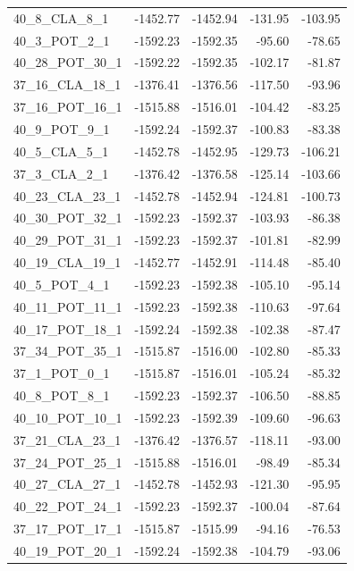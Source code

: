 \documentclass[journal=jacsat,manuscript=article]{achemso}
\begin{document}
\begin{table}[b!]
\begin{tabular}{lrrrr}
40\_8\_CLA\_8\_1   &  -1452.77 &  -1452.94 & -131.95 & -103.95 \\
40\_3\_POT\_2\_1   &  -1592.23 &  -1592.35 &  -95.60 &  -78.65 \\
40\_28\_POT\_30\_1 &  -1592.22 &  -1592.35 & -102.17 &  -81.87 \\
37\_16\_CLA\_18\_1 &  -1376.41 &  -1376.56 & -117.50 &  -93.96 \\
37\_16\_POT\_16\_1 &  -1515.88 &  -1516.01 & -104.42 &  -83.25 \\
40\_9\_POT\_9\_1   &  -1592.24 &  -1592.37 & -100.83 &  -83.38 \\
40\_5\_CLA\_5\_1   &  -1452.78 &  -1452.95 & -129.73 & -106.21 \\
37\_3\_CLA\_2\_1   &  -1376.42 &  -1376.58 & -125.14 & -103.66 \\
40\_23\_CLA\_23\_1 &  -1452.78 &  -1452.94 & -124.81 & -100.73 \\
40\_30\_POT\_32\_1 &  -1592.23 &  -1592.37 & -103.93 &  -86.38 \\
40\_29\_POT\_31\_1 &  -1592.23 &  -1592.37 & -101.81 &  -82.99 \\
40\_19\_CLA\_19\_1 &  -1452.77 &  -1452.91 & -114.48 &  -85.40 \\
40\_5\_POT\_4\_1   &  -1592.23 &  -1592.38 & -105.10 &  -95.14 \\
40\_11\_POT\_11\_1 &  -1592.23 &  -1592.38 & -110.63 &  -97.64 \\
40\_17\_POT\_18\_1 &  -1592.24 &  -1592.38 & -102.38 &  -87.47 \\
37\_34\_POT\_35\_1 &  -1515.87 &  -1516.00 & -102.80 &  -85.33 \\
37\_1\_POT\_0\_1   &  -1515.87 &  -1516.01 & -105.24 &  -85.32 \\
40\_8\_POT\_8\_1   &  -1592.23 &  -1592.37 & -106.50 &  -88.85 \\
40\_10\_POT\_10\_1 &  -1592.23 &  -1592.39 & -109.60 &  -96.63 \\
37\_21\_CLA\_23\_1 &  -1376.42 &  -1376.57 & -118.11 &  -93.00 \\
37\_24\_POT\_25\_1 &  -1515.88 &  -1516.01 &  -98.49 &  -85.34 \\
40\_27\_CLA\_27\_1 &  -1452.78 &  -1452.93 & -121.30 &  -95.95 \\
40\_22\_POT\_24\_1 &  -1592.23 &  -1592.37 & -100.04 &  -87.64 \\
37\_17\_POT\_17\_1 &  -1515.87 &  -1515.99 &  -94.16 &  -76.53 \\
40\_19\_POT\_20\_1 &  -1592.24 &  -1592.38 & -104.79 &  -93.06 \\

\end{tabular}
\end{table}
\end{document}
